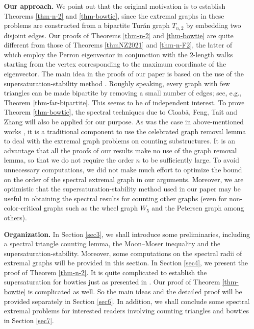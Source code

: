 \documentclass[11pt]{article}
\begin{document}
{\bf Our approach.} 
We point out that 
the original motivation is to establish Theorems \ref{thm-n-2} 
and \ref{thm-bowtie}, since the extremal graphs in these problems 
are constructed from a bipartite Tur\'{a}n graph $T_{n,2}$ 
by embedding two disjoint edges.  
Our proofs of Theorems \ref{thm-n-2} 
and \ref{thm-bowtie} are quite different from those of Theorems \ref{thmNZ2021} and \ref{thm-n-F2}, 
the latter of which employ the Perron eigenvector 
in conjunction with the $2$-length walks starting from the vertex corresponding to the maximum coordinate of the eigenvector.   
The main idea in the proofs of our paper is based on the use of  
the supersaturation-stability method \cite{LFP2024-triangular}. 
Roughly speaking, every graph with few triangles can be made bipartite 
by removing a small number of  edges; 
see, e.g., Theorem \ref{thm-far-bipartite}.  
This seems to be of independent interest. 
To prove Theorem \ref{thm-bowtie}, 
 the spectral techniques due to 
Cioab\u{a}, Feng, Tait and Zhang \cite{CFTZ20} 
will also be applied for our purpose. 
As was the case in above-mentioned works \cite{Mub2010, PY2017, LM2022-Erd-Rad, KMP2020}, 
it is a traditional component to use the celebrated graph removal lemma 
to deal with the extremal graph problems on counting substructures. 
It is an advantage that all the proofs of our results make no use of the graph removal lemma,  
so that we do not require the order $n$ to be sufficiently large. 
To avoid unnecessary computations, 
we did not make much effort to optimize the bound on the order of the spectral extremal graph in our arguments. 
Moreover, we are optimistic that the supersaturation-stability method used in our paper 
may be useful in obtaining the spectral results for counting other graphs (even for non-color-critical graphs such as the wheel graph $W_5$ and the Petersen graph among others).   



\medskip 
\noindent 
{\bf Organization.}   
 In Section \ref{sec3}, 
we shall introduce some preliminaries, 
including a spectral triangle counting lemma, 
the Moon--Moser inequality and the supersaturation-stability. Moreover, some 
 computations on the spectral radii of extremal graphs will be provided 
 in this section.  
 In Section \ref{sec4}, 
 we present the proof of Theorem  \ref{thm-n-2}. 
It is quite complicated to establish the supersaturation 
 for bowties just as presented in \cite{KMP2020}.  
 Our proof of Theorem \ref{thm-bowtie} is complicated as well.  
So the main ideas and the detailed proof will be provided separately in Section \ref{sec6}. 
In addition, we shall conclude some 
spectral extremal problems for interested readers involving 
 counting triangles and bowties in Section \ref{sec7}. 
\end{document}
